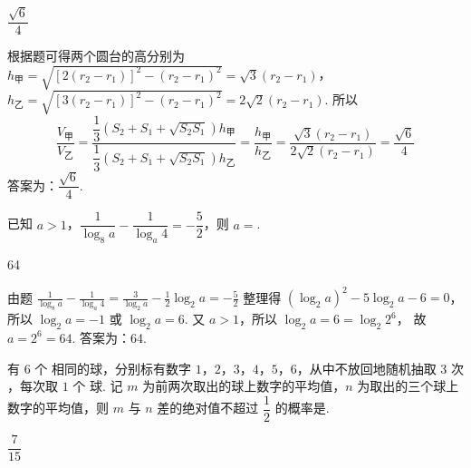 \begin{answer}
\( \dfrac{\sqrt{6}}{4} \)
\end{answer}

\begin{solution}
根据题可得两个圆台的高分别为
\(h_{\text{甲}}=\sqrt{\left[ 2\left( r_2-r_1 \right) \right]^2-\left( r_2-r_1 \right)^2}=\sqrt{3}\left( r_2-r_1 \right)\)，
\(h_{\text{乙}}=\sqrt{\left[ 3\left( r_2-r_1 \right) \right]^2-\left( r_2-r_1 \right)^2}=2\sqrt{2}\left( r_2-r_1 \right)\).
所以
\[
\frac{V_{\text{甲}}}{V_{\text{乙}}}
=\frac{\dfrac{1}{3}\left( S_2+S_1+\sqrt{S_2S_1} \right)h_{\text{甲}}}{\dfrac{1}{3}\left( S_2+S_1+\sqrt{S_2S_1} \right)h_{\text{乙}}}
=\frac{h_{\text{甲}}}{h_{\text{乙}}}
=\frac{\sqrt{3}\left( r_2-r_1 \right)}{2\sqrt{2}\left( r_2-r_1 \right)}
=\frac{\sqrt{6}}{4}
\]
答案为：\( \dfrac{\sqrt{6}}{4} \).
\end{solution}

\begin{problem}
已知 \( a>1 \)，\( \dfrac{1}{\log_8 a}-\dfrac{1}{\log_a 4}=-\dfrac{5}{2} \)，则 \( a= \)\fillinblank{}.
\end{problem}

\begin{answer}
64
\end{answer}

\begin{solution}
由题
\(
\frac{1}{\log_8 a}-\frac{1}{\log_a 4}=\frac{3}{\log_2 a}-\frac{1}{2}\log_2 a=-\frac{5}{2}
\)
整理得
\(
\left( \log_2 a \right)^2-5\log_2 a-6=0
\)，
所以
\(\log_2 a=-1\)
或
\(\log_2 a=6\).
又 \( a>1 \)，所以
\(\log_2 a=6=\log_2 2^6\)，
故
\(a=2^6=64\).
答案为：64.
\end{solution}

\begin{problem}
有 \( 6\text{ 个} \) 相同的球，分别标有数字 \(1\)，\(2\)，\(3\)，\(4\)，\(5\)，\(6\)，从中不放回地随机抽取 \( 3\text{ 次} \)，每次取 \( 1\text{ 个} \) 球. 记 \( m \) 为前两次取出的球上数字的平均值，\( n \) 为取出的三个球上数字的平均值，则 \( m \) 与 \( n \) 差的绝对值不超过 \( \dfrac{1}{2} \) 的概率是\fillinblank{}.
\end{problem}

\begin{answer}
\( \dfrac{7}{15} \)
\end{answer}

